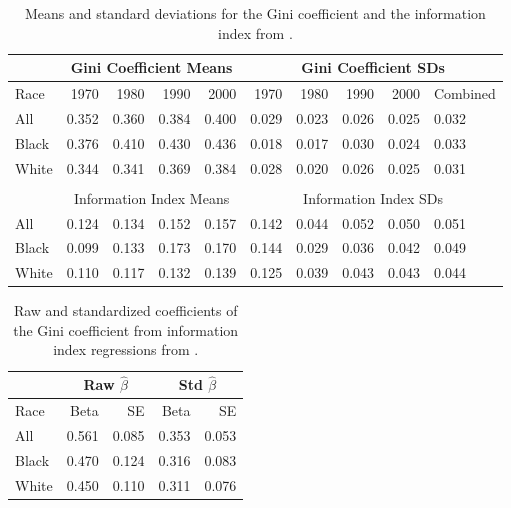 \documentclass[12pt]{article}
\begin{document}
\begin{table}[ht]
  \centering
  \begin{tabular}{l|rrrr|rrrrl}
& \multicolumn{4}{c}{Gini Coefficient Means} & \multicolumn{5}{c}{Gini Coefficient SDs} \\\hline
    Race  & 1970  & 1980  & 1990  & 2000  & 1970  & 1980  & 1990  & 2000  & Combined \\\hline
    All   & 0.352 & 0.360 & 0.384 & 0.400 & 0.029 & 0.023 & 0.026 & 0.025 & 0.032 \\    
    Black & 0.376 & 0.410 & 0.430 & 0.436 & 0.018 & 0.017 & 0.030 & 0.024 & 0.033 \\
    White & 0.344 & 0.341 & 0.369 & 0.384 & 0.028 & 0.020 & 0.026 & 0.025 & 0.031 \\
    \multicolumn{10}{c}{} \\
& \multicolumn{4}{c}{Information Index Means} & \multicolumn{5}{c}{Information Index SDs} \\\hline
    All   & 0.124 & 0.134 & 0.152 & 0.157 & 0.142 & 0.044 & 0.052 & 0.050 & 0.051 \\    
    Black & 0.099 & 0.133 & 0.173 & 0.170 & 0.144 & 0.029 & 0.036 & 0.042 & 0.049 \\
    White & 0.110 & 0.117 & 0.132 & 0.139 & 0.125 & 0.039 & 0.043 & 0.043 & 0.044 \\
  \end{tabular}
\label{tab:sds}
\caption{Means and standard deviations for the Gini coefficient and the information index from \citet{reardon2011income}.}
\end{table}


\begin{table}[ht]
  \centering
  \begin{tabular}{lrrrr}
      & \multicolumn{2}{c}{Raw $\widehat{\beta}$} & \multicolumn{2}{c}{Std $\widehat{\beta}$}\\\hline
    Race  & Beta & SE & Beta & SE \\\hline
    All   & 0.561 & 0.085 & 0.353 & 0.053 \\    
    Black & 0.470 & 0.124 & 0.316 & 0.083 \\
    White & 0.450 & 0.110 & 0.311 & 0.076 \\
  \end{tabular}
  \label{tab:std.coefs}
  \caption{Raw and standardized coefficients of the Gini coefficient from information index regressions from \citet{reardon2011income}.}
\end{table}

\clearpage


\end{document}
